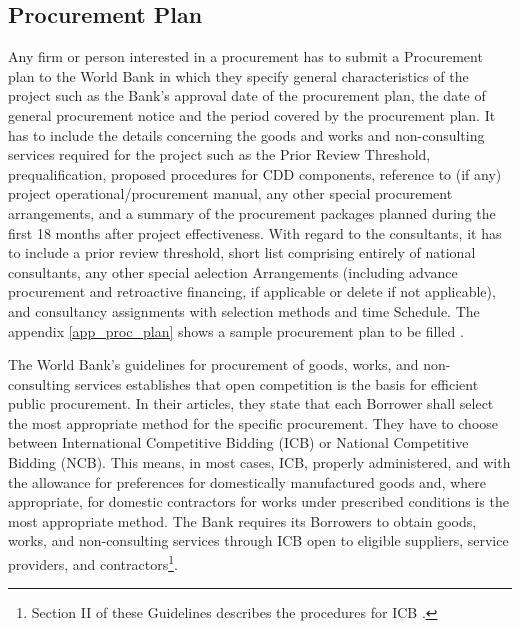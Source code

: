 \subsection{Procurement Plan}

Any firm or person interested in a procurement has to submit a Procurement plan to the World Bank in which they specify general characteristics of the project such as the Bank’s approval date of the procurement plan, the date of general procurement notice and the period covered by the procurement plan. It has to include the details concerning the goods and works and non-consulting services required for the project such as the Prior Review Threshold, prequalification,  proposed procedures for CDD components, reference to (if any) project operational/procurement manual, any other special procurement arrangements, and a summary of the procurement packages planned during the first 18 months after project effectiveness. With regard to the consultants, it has to include a prior review threshold, short list comprising entirely of national consultants, any other special aelection Arrangements (including advance procurement and retroactive financing, if applicable or delete if not applicable), and consultancy assignments with selection methods and time Schedule. The appendix \ref{app_proc_plan} shows a sample procurement plan to be filled \parencite{wb_sample_proc}. 


The World Bank's guidelines for procurement of goods, works, and non-consulting services \parencite{wb_g_proc} establishes that open competition is the basis for efficient public procurement.  In their articles, they state that each Borrower shall select the most appropriate method for the specific procurement. They have to choose between International Competitive Bidding (ICB) or National Competitive Bidding (NCB). This means, in most cases, ICB, properly administered, and with the allowance for preferences for domestically manufactured goods and, where appropriate, for domestic contractors for works under prescribed conditions is the most appropriate method. The Bank requires its Borrowers to obtain goods, works, and non-consulting services through ICB open to eligible suppliers, service providers, and contractors\footnote{Section II of these Guidelines describes the procedures for ICB \parencite{wb_g_proc}.}.


